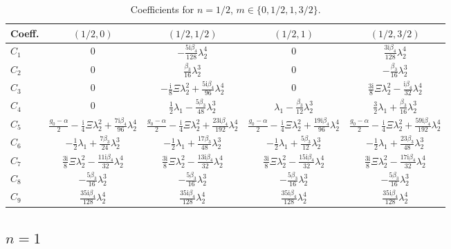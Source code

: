 \documentclass[11pt]{article}
\newcommand{\ii}{\mathrm{i}}
\begin{document}
\begin{table}[htbp]
\centering\small
\caption{Coefficients for $n=1/2$, $m\in\{0,1/2,1,3/2\}$.}
\begin{tabular}{lcccc}
\toprule
Coeff. & $(1/2,0)$ & $(1/2,1/2)$ & $(1/2,1)$ & $(1/2,3/2)$ \\
\midrule
$C_1$ & $0$ & $-\tfrac{5\ii\beta_4}{128}\lambda_2^4$ & $0$ & $\tfrac{3\ii\beta_4}{128}\lambda_2^4$ \\
$C_2$ & $0$ & $\tfrac{\beta_3}{16}\lambda_2^3$ & $0$ & $-\tfrac{\beta_3}{16}\lambda_2^3$ \\
$C_3$ & $0$ & $-\tfrac{\ii}{8}\Xi\lambda_2^2+\tfrac{5\ii\beta_4}{96}\lambda_2^4$ & $0$ & $\tfrac{3\ii}{8}\Xi\lambda_2^2-\tfrac{\ii\beta_4}{32}\lambda_2^4$ \\
$C_4$ & $0$ & $\tfrac12\lambda_1-\tfrac{5\beta_3}{48}\lambda_2^3$ & $\lambda_1-\tfrac{\beta_3}{12}\lambda_2^3$ & $\tfrac32\lambda_1+\tfrac{\beta_3}{16}\lambda_2^3$ \\
$C_5$ & $\tfrac{g_0-\alpha}{2}-\tfrac{\ii}{4}\Xi\lambda_2^2+\tfrac{7\ii\beta_4}{96}\lambda_2^4$ & $\tfrac{g_0-\alpha}{2}-\tfrac{\ii}{4}\Xi\lambda_2^2+\tfrac{23\ii\beta_4}{192}\lambda_2^4$ & $\tfrac{g_0-\alpha}{2}-\tfrac{\ii}{4}\Xi\lambda_2^2+\tfrac{19\ii\beta_4}{96}\lambda_2^4$ & $\tfrac{g_0-\alpha}{2}-\tfrac{\ii}{4}\Xi\lambda_2^2+\tfrac{59\ii\beta_4}{192}\lambda_2^4$ \\
$C_6$ & $-\tfrac12\lambda_1+\tfrac{7\beta_3}{24}\lambda_2^3$ & $-\tfrac12\lambda_1+\tfrac{17\beta_3}{48}\lambda_2^3$ & $-\tfrac12\lambda_1+\tfrac{5\beta_3}{12}\lambda_2^3$ & $-\tfrac12\lambda_1+\tfrac{23\beta_3}{48}\lambda_2^3$ \\
$C_7$ & $\tfrac{3\ii}{8}\Xi\lambda_2^2-\tfrac{11\ii\beta_4}{32}\lambda_2^4$ & $\tfrac{3\ii}{8}\Xi\lambda_2^2-\tfrac{13\ii\beta_4}{32}\lambda_2^4$ & $\tfrac{3\ii}{8}\Xi\lambda_2^2-\tfrac{15\ii\beta_4}{32}\lambda_2^4$ & $\tfrac{3\ii}{8}\Xi\lambda_2^2-\tfrac{17\ii\beta_4}{32}\lambda_2^4$ \\
$C_8$ & $-\tfrac{5\beta_3}{16}\lambda_2^3$ & $-\tfrac{5\beta_3}{16}\lambda_2^3$ & $-\tfrac{5\beta_3}{16}\lambda_2^3$ & $-\tfrac{5\beta_3}{16}\lambda_2^3$ \\
$C_9$ & $\tfrac{35\ii\beta_4}{128}\lambda_2^4$ & $\tfrac{35\ii\beta_4}{128}\lambda_2^4$ & $\tfrac{35\ii\beta_4}{128}\lambda_2^4$ & $\tfrac{35\ii\beta_4}{128}\lambda_2^4$ \\
\bottomrule
\end{tabular}
\end{table}

\subsection{$n=1$}
\end{document}
